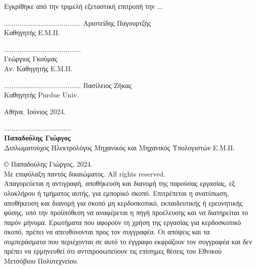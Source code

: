 \noindent
Εγκρίθηκε από την τριμελή εξεταστική επιτροπή την ...
\vspace{10ex}
\begin{center}
\scriptsize
\parbox[b]{0.3\textwidth} {\center
	........................................
	Αριστείδης Παγουρτζής \\
	Καθηγητής Ε.Μ.Π.
}
\parbox[b]{0.3\textwidth} {\center
	........................................\\
	Γεώργιος Γκούμας \\
	Αν. Καθηγητής Ε.Μ.Π.
}
\parbox[b]{0.3\textwidth} {\center
	........................................
	Βασίλειος Ζήκας \\
	Καθηγητής Purdue Univ.
}

\vspace{20ex}
\normalsize
\noindent
Αθήνα, Ιούνιος 2024.
\newpage
\end{center}
\hspace{10pt}

\vspace{30ex}
\noindent
................................... \\
\textbf{Παπαδούλης Γιώργος} \\
Διπλωματούχος Ηλεκτρολόγος Μηχανικός και Μηχανικός Υπολογιστών Ε.Μ.Π. \\
\vspace{40ex}

\small
\noindent
\copyright \hspace{1em} Παπαδούλης Γιώργος, 2024. \\
Με επιφύλαξη παντός δικαιώματος. All rights reserved. \\
Απαγορεύεται η αντιγραφή, αποθήκευση και διανομή της παρούσας εργασίας, εξ ολοκλήρου ή τμήματος
αυτής, για εμπορικό σκοπό. Επιτρέπεται η ανατύπωση, αποθήκευση και διανομή για σκοπό μη κερδοσκοπικό,
εκπαιδευτικής ή ερευνητικής φύσης, υπό την προϋπόθεση να αναφέρεται η πηγή προέλευσης και να διατηρείται το παρόν μήνυμα. Ερωτήματα που αφορούν τη χρήση της εργασίας για κερδοσκοπικό σκοπό, πρέπει να
απευθύνονται προς τον συγγραφέα.
Οι απόψεις και τα συμπεράσματα που περιέχονται σε αυτό το έγγραφο εκφράζουν τον συγγραφέα και δεν
πρέπει να ερμηνευθεί ότι αντιπροσωπεύουν τις επίσημες θέσεις του Εθνικού Μετσόβιου Πολυτεχνείου.

            
